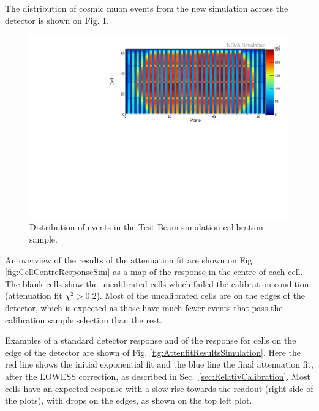The distribution of cosmic muon events from the new simulation across the detector is shown on Fig. \ref{fig:CalibhistSim}.

\begin{figure}[h]
\centering
\includegraphics[width=.9\textwidth]{PlotsTBCalibTechnote/Attenprofs_Simulation_CellPlane.pdf}
\caption{Distribution of events in the Test Beam simulation calibration sample.}
\label{fig:CalibhistSim}
\end{figure}

An overview of the results of the attenuation fit are shown on Fig. \ref{fig:CellCentreResponseSim} as a map of the response in the centre of each cell. The blank cells show the uncalibrated cells which failed the calibration condition (attenuation fit $\chi^2>0.2$). Most of the uncalibrated cells are on the edges of the detector, which is expected as those have much fewer events that pass the calibration sample selection than the rest.

Examples of a standard detector response and of the response for cells on the edge of the detector are shown of Fig. \ref{fig:AttenfitResultsSimulation}. Here the red line shows the initial exponential fit and the blue line the final attenuation fit, after the LOWESS correction, as described in Sec.~\ref{sec:RelativCalibration}. Most cells have an expected response with a slow rise towards the readout (right side of the plots), with drops on the edges, as shown on the top left plot.


